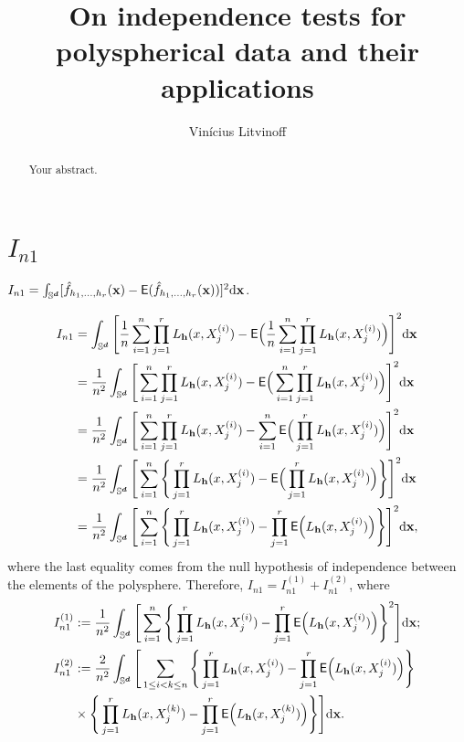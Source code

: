 \documentclass{article}
\title{On independence tests for polyspherical data and
their applications}
\author{Vinícius Litvinoff}
\begin{document}
\maketitle

\begin{abstract}
Your abstract.
\end{abstract}

\section{$I_{n1}$}

$I_{n1} = \int_{\mathbb{S}^{\boldsymbol{d}}} [\hat{f}_{h_1, \dots, h_r}(\mathbf{x}) - \mathsf{E} (\hat{f}_{h_1, \dots, h_r}(\mathbf{x}))]^2 \mathrm{d} \mathbf{x}$.

\begin{align}
    I_{n1} &= \int_{\mathbb{S}^{\boldsymbol{d}}} \Bigg[ \frac{1}{n} \sum_{i=1}^{n} \prod_{j=1}^{r} L_{\mathbf{h}} (x,X_j^{(i)}) - \mathsf{E} \Big( \frac{1}{n} \sum_{i=1}^{n} \prod_{j=1}^{r} L_{\mathbf{h}} (x,X_j^{(i)}) \Big) \Bigg]^2 \mathrm{d} \mathbf{x} \\
    &= \frac{1}{n^2} \int_{\mathbb{S}^{\boldsymbol{d}}} \Bigg[ \sum_{i=1}^{n} \prod_{j=1}^{r} L_{\mathbf{h}} (x,X_j^{(i)}) - \mathsf{E} \Big( \sum_{i=1}^{n} \prod_{j=1}^{r} L_{\mathbf{h}} (x,X_j^{(i)}) \Big) \Bigg]^2 \mathrm{d} \mathbf{x} \\
    &= \frac{1}{n^2} \int_{\mathbb{S}^{\boldsymbol{d}}} \Bigg[ \sum_{i=1}^{n} \prod_{j=1}^{r} L_{\mathbf{h}} (x,X_j^{(i)}) - \sum_{i=1}^{n} \mathsf{E} \Big( \prod_{j=1}^{r} L_{\mathbf{h}} (x,X_j^{(i)}) \Big) \Bigg]^2 \mathrm{d} \mathbf{x} \\
    &= \frac{1}{n^2} \int_{\mathbb{S}^{\boldsymbol{d}}} \Bigg[ \sum_{i=1}^{n} \Bigg\{ \prod_{j=1}^{r} L_{\mathbf{h}} (x,X_j^{(i)}) - \mathsf{E} \Big( \prod_{j=1}^{r} L_{\mathbf{h}} (x,X_j^{(i)}) \Big) \Bigg\} \Bigg]^2 \mathrm{d} \mathbf{x} \\
    &= \frac{1}{n^2} \int_{\mathbb{S}^{\boldsymbol{d}}} \Bigg[ \sum_{i=1}^{n} \Bigg\{ \prod_{j=1}^{r} L_{\mathbf{h}} (x,X_j^{(i)}) - \prod_{j=1}^{r} \mathsf{E} \Big( L_{\mathbf{h}} (x,X_j^{(i)}) \Big) \Bigg\} \Bigg]^2 \mathrm{d} \mathbf{x},
\end{align}
where the last equality comes from the null hypothesis of independence between the elements of the polysphere. Therefore, $I_{n1} = I_{n1}^{(1)} + I_{n1}^{(2)}$, where
\begin{align}
    I_{n1}^{(1)} &:= \frac{1}{n^2} \int_{\mathbb{S}^{\boldsymbol{d}}} \Bigg[ \sum_{i=1}^{n} \Bigg\{ \prod_{j=1}^{r} L_{\mathbf{h}} (x,X_j^{(i)}) - \prod_{j=1}^{r} \mathsf{E} \Big( L_{\mathbf{h}} (x,X_j^{(i)}) \Big) \Bigg\}^2 \Bigg] \mathrm{d} \mathbf{x}; \\
    I_{n1}^{(2)} &:= \frac{2}{n^2} \int_{\mathbb{S}^{\boldsymbol{d}}} \Bigg[ \sum_{1 \le i<k \le n} \Bigg\{ \prod_{j=1}^{r} L_{\mathbf{h}} (x,X_j^{(i)}) - \prod_{j=1}^{r} \mathsf{E} \Big( L_{\mathbf{h}} (x,X_j^{(i)}) \Big) \Bigg\} \\
    &\times \Bigg\{ \prod_{j=1}^{r} L_{\mathbf{h}} (x,X_j^{(k)}) - \prod_{j=1}^{r} \mathsf{E} \Big( L_{\mathbf{h}} (x,X_j^{(k)}) \Big) \Bigg\} \Bigg] \mathrm{d} \mathbf{x}.
\end{align}
\end{document}

